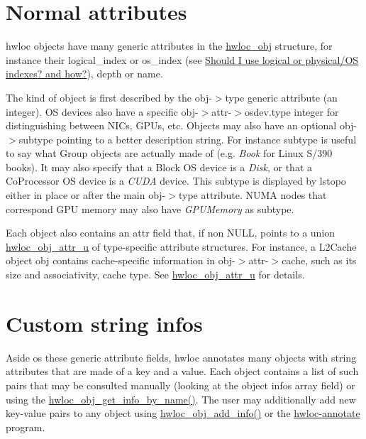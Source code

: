  \hypertarget{a00386_attributes_normal}{}\section{Normal attributes}\label{a00386_attributes_normal}
hwloc objects have many generic attributes in the \hyperlink{a00238}{hwloc\+\_\+obj} structure, for instance their {\ttfamily logical\+\_\+index} or {\ttfamily os\+\_\+index} (see \hyperlink{a00394_faq_indexes}{Should I use logical or physical/\+OS indexes? and how?}), {\ttfamily depth} or {\ttfamily name}.

The kind of object is first described by the {\ttfamily obj-\/$>$type} generic attribute (an integer). OS devices also have a specific {\ttfamily obj-\/$>$attr-\/$>$osdev.\+type} integer for distinguishing between N\+I\+Cs, G\+P\+Us, etc. Objects may also have an optional {\ttfamily obj-\/$>$subtype} pointing to a better description string. For instance subtype is useful to say what Group objects are actually made of (e.\+g. {\itshape Book} for Linux S/390 books). It may also specify that a Block OS device is a {\itshape Disk}, or that a Co\+Processor OS device is a {\itshape C\+U\+DA} device. This subtype is displayed by lstopo either in place or after the main {\ttfamily obj-\/$>$type} attribute. N\+U\+MA nodes that correspond G\+PU memory may also have {\itshape G\+P\+U\+Memory} as subtype.

Each object also contains an {\ttfamily attr} field that, if non N\+U\+LL, points to a union \hyperlink{a00242}{hwloc\+\_\+obj\+\_\+attr\+\_\+u} of type-\/specific attribute structures. For instance, a L2\+Cache object {\ttfamily obj} contains cache-\/specific information in {\ttfamily obj-\/$>$attr-\/$>$cache}, such as its size and associativity, cache type. See \hyperlink{a00242}{hwloc\+\_\+obj\+\_\+attr\+\_\+u} for details.

 \hypertarget{a00386_attributes_info}{}\section{Custom string infos}\label{a00386_attributes_info}
Aside os these generic attribute fields, hwloc annotates many objects with string attributes that are made of a key and a value. Each object contains a list of such pairs that may be consulted manually (looking at the object {\ttfamily infos} array field) or using the \hyperlink{a00189_gab358661a92bb27d8542b255cc9f6f25e}{hwloc\+\_\+obj\+\_\+get\+\_\+info\+\_\+by\+\_\+name()}. The user may additionally add new key-\/value pairs to any object using \hyperlink{a00189_gace7654bb8a9002caae1a4b8a59e7452e}{hwloc\+\_\+obj\+\_\+add\+\_\+info()} or the \hyperlink{a00381_cli_hwloc_annotate}{hwloc-\/annotate} program.

